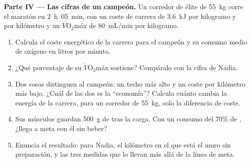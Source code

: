 \begin{problem}
\medskip
\noindent\textbf{Parte IV --- Las cifras de un campeón.}
Un corredor de élite de \qty{55}{kg} corre el maratón en
\qty{2}{h}\, \qty{05}{min}, con un coste de carrera de \qty{3.6}{kJ}
por kilogramo y por kilómetro y un $\dot V\!\mathrm{O_2}$máx de
\qty{80}{mL/min} por kilogramo.
\begin{enumerate}[resume]
  \item Calcula el coste energético de la carrera para el campeón y su
        consumo medio de oxígeno en litros por minuto.
  \item ¿Qué porcentaje de su $\dot V\!\mathrm{O_2}$máx sostiene?
        Compáralo con la cifra de Nadia.
  \item Dos cosas distinguen al campeón: un techo más alto y un coste
        por kilómetro más bajo. ¿Cuál de las dos es la
        ``economía''? Calcula cuánto cambia la energía de la carrera,
        para un corredor de \qty{55}{kg}, solo la diferencia de coste.
  \item Sus músculos guardan \qty{500}{g} de  tras la carga.
        Con un consumo del 70\% de , ¿llega a meta con él sin
        beber?
  \item Enuncia el resultado: para Nadia, el kilómetro en el que está
        el muro sin preparación, y las tres medidas que lo llevan más
        allá de la línea de meta.
\end{enumerate}
\end{problem}
